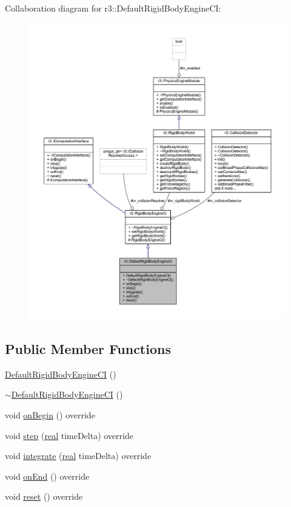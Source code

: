 Collaboration diagram for r3\+:\+:Default\+Rigid\+Body\+Engine\+CI\+:\nopagebreak
\begin{figure}[H]
\begin{center}
\leavevmode
\includegraphics[width=350pt]{classr3_1_1_default_rigid_body_engine_c_i__coll__graph}
\end{center}
\end{figure}
\subsection*{Public Member Functions}
\begin{DoxyCompactItemize}
\item 
\mbox{\hyperlink{classr3_1_1_default_rigid_body_engine_c_i_a277f7da049340a3957fdaf8cb7ee0dfe}{Default\+Rigid\+Body\+Engine\+CI}} ()
\item 
\mbox{\hyperlink{classr3_1_1_default_rigid_body_engine_c_i_af68e19bbae7b792bf57d24a4004295eb}{$\sim$\+Default\+Rigid\+Body\+Engine\+CI}} ()
\item 
void \mbox{\hyperlink{classr3_1_1_default_rigid_body_engine_c_i_a5d9e40ea40845499f01081d21cd9ff64}{on\+Begin}} () override
\item 
void \mbox{\hyperlink{classr3_1_1_default_rigid_body_engine_c_i_ac45ae1d1889c75e6839b865870cbf59c}{step}} (\mbox{\hyperlink{namespacer3_ab2016b3e3f743fb735afce242f0dc1eb}{real}} time\+Delta) override
\item 
void \mbox{\hyperlink{classr3_1_1_default_rigid_body_engine_c_i_a4b79e7e4bc76eedcad7ef5c4777b9d33}{integrate}} (\mbox{\hyperlink{namespacer3_ab2016b3e3f743fb735afce242f0dc1eb}{real}} time\+Delta) override
\item 
void \mbox{\hyperlink{classr3_1_1_default_rigid_body_engine_c_i_ad7746126ebd5aab4cfc352dd9facabb2}{on\+End}} () override
\item 
void \mbox{\hyperlink{classr3_1_1_default_rigid_body_engine_c_i_a06bd27e94b26017e7960e01f6e884e33}{reset}} () override
\end{DoxyCompactItemize}
